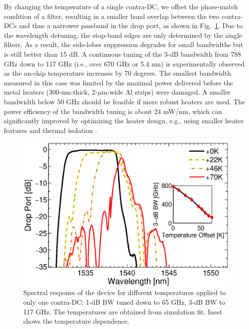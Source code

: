 \documentclass[osajnl,twocolumn,showpacs,superscriptaddress,10pt]{revtex4-1}
\begin{document}
By changing the temperature of a single contra-DC, we offset the phase-match condition of a filter, resulting in a smaller band overlap between the two contra-DCs and thus a narrower passband in the drop port, as shown in Fig.~\ref{fig:bandTune}.  
Due to the wavelength detuning,  the stop-band edges are only determined by the single filters. 
As a result, the side-lobes suppression degrades  for small bandwidths but is still better than 15 dB. A continuous tuning of the 3-dB bandwidth from 788 GHz down to 117 GHz (i.e., over 670 GHz or 5.4 nm) is experimentally observed as the on-chip temperature increases by 70 degrees. 
The smallest bandwidth measured in this case was limited by the maximal power delivered before the metal heaters (300-nm-thick, 2-$\mu$m-wide Al strips) were damaged. A smaller bandwidth below 50 GHz should be feasible if more robust heaters are used.
The power efficiency of the bandwidth tuning is about 24 mW/nm, which can significantly improved by optimizing the heater design, e.g., using smaller heater features and thermal isolation \cite{dong2010thermally}.

\begin{figure}[htbp]
\centering
\includegraphics[width=.99\columnwidth]{data/Band6}
\caption{Spectral response of the device for different temperatures applied to only one contra-DC: 1-dB BW tuned down to 65 GHz, 3-dB BW to 117 GHz. The temperatures are obtained from simulation fit. Inset shows the temperature dependence.}
\label{fig:bandTune}
\end{figure} 
\end{document}
